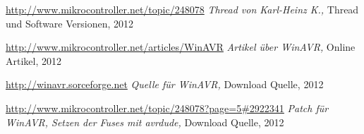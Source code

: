 \documentclass[pdftex,12pt,a4paper,oneside,english]{report}
\begin{document}
\begin{thebibliography}{99}
\url{http://www.mikrocontroller.net/topic/248078}
\emph{Thread von Karl-Heinz K.,}
Thread und Software Versionen,
2012

\url{http://www.mikrocontroller.net/articles/WinAVR}
\emph{Artikel über WinAVR,}
Online Artikel,
2012

\url{http://winavr.sorceforge.net}
\emph{Quelle für WinAVR,}
Download Quelle,
2012

\url{http://www.mikrocontroller.net/topic/248078?page=5#2922341}
\emph{Patch für WinAVR, Setzen der Fuses mit avrdude,}
Download Quelle,
2012


\end{thebibliography}
\end{document}
